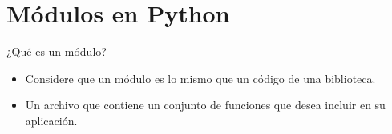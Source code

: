 
\section{Módulos en Python}

\begin{frame}[c]{¿Qué es un módulo?}
  \begin{itemize}
    \item Considere que un módulo es lo mismo que un código de una biblioteca.
    \item Un archivo que contiene un conjunto de funciones que desea incluir
      en su aplicación.
  \end{itemize}
\end{frame}

\begin{frame}[fragile]
  \frametitle{}


  \vspace{\baselineskip}
  \begin{lstlisting}[language=Python]
  \end{lstlisting}
\end{frame}

